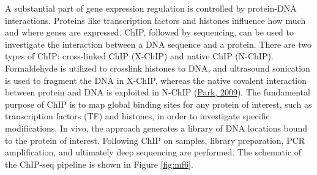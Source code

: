 \documentclass[12pt,twoside]{reedthesis}
\begin{document}
A substantial part of gene expression regulation is controlled by
protein-DNA interactions. Proteins like transcription factors and
histones influence how much and where genes are expressed. ChIP,
followed by sequencing, can be used to investigate the interaction
between a DNA sequence and a protein. There are two types of ChIP:
cross-linked ChIP (X-ChIP) and native ChIP (N-ChIP). Formaldehyde is
utilized to crosslink histones to DNA, and ultrasound sonication is used
to fragment the DNA in X-ChIP, whereas the native covalent interaction
between protein and DNA is exploited in N-ChIP (\protect\hyperlink{ref-park2009}{Park, 2009}). The
fundamental purpose of ChIP is to map global binding sites for any
protein of interest, such as transcription factors (TF) and histones, in
order to investigate specific modifications. In vivo, the approach
generates a library of DNA locations bound to the protein of interest.
Following ChIP on samples, library preparation, PCR amplification, and
ultimately deep sequencing are performed. The schematic of the ChIP-seq
pipeline is shown in Figure \ref{fig:mf6}.
\end{document}

